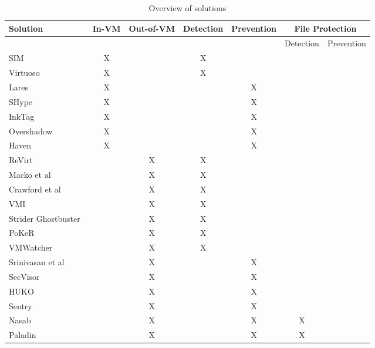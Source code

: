 \begin{table}[h]
	\centering
	\caption{Overview of solutions}
	\label{tbl:overview}
	\begin{tabular}{lcccccc}
		\toprule
		Solution & In-VM & Out-of-VM & Detection & Prevention  & \multicolumn{2}{c}{File Protection}  \\
		\hline
		&		 &			 &  &  & \scriptsize {Detection} & \scriptsize {Prevention} \\
		\hline
		SIM~\cite{sharif2009secure} 					& X &   & X &   &   & \\
		Virtuoso~\cite{dolan2011virtuoso} 				& X &   & X &   &   & \\
		Lares~\cite{payne2008lares} 					& X &   &   & X &   & \\
		SHype~\cite{sailer2005building}					& X &   &   & X &   & \\
		InkTag~\cite{hofmann2013inktag}					& X &   &   & X &   & \\
		Overshadow~\cite{chen2008overshadow}			& X &   &   & X &   & \\
		Haven~\cite{baumann2015shielding}				& X &   &   & X &   & \\
		ReVirt~\cite{dunlap2002revirt}					&   & X & X &   &   & \\
		Macko et al~\cite{macko2011collecting}			&   & X & X &   &   & \\
		Crawford et al~\cite{crawford2013insider}		&   & X & X &   &   & \\
		VMI~\cite{garfinkel2003virtual}					&   & X & X &   &   & \\
		Strider Ghostbuster~\cite{wang2005detecting}	&   & X & X &   &   & \\
		PoKeR~\cite{riley2009multi}						&   & X & X &   &   & \\
		VMWatcher~\cite{jiang2007stealthy}				&   & X & X &   &   & \\
		Srinivasan et al~\cite{srinivasan2011process}	&   & X &   & X &   & \\
		SecVisor~\cite{seshadri2007secvisor} 			&   & X &   & X &   & \\
		HUKO~\cite{xiong2011practical}					&   & X &   & X &   & \\
		Sentry~\cite{srivastava2012efficient}			&   & X &   & X &   & \\
		Nasab~\cite{nasab2012security}					&   & X &   & X & X & \\
		Paladin~\cite{baliga2008automated}				&   & X &   & X & X & \\
		\bottomrule
	\end{tabular}	
\end{table}

